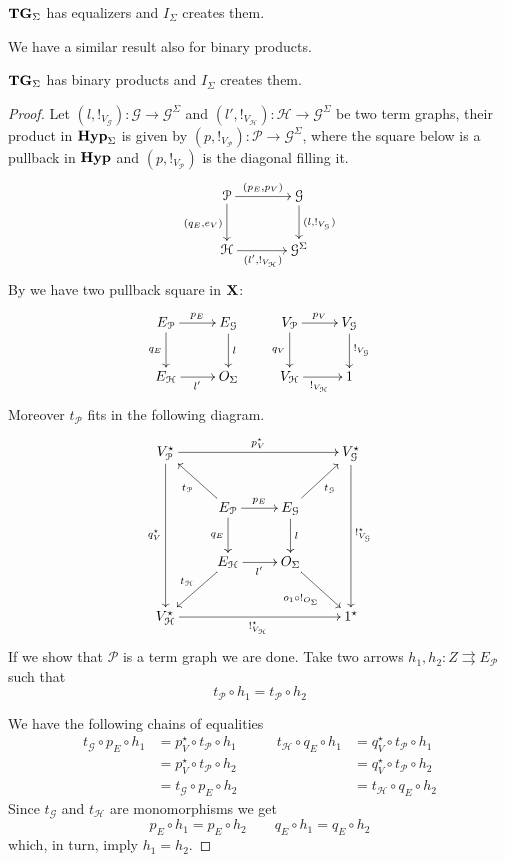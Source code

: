 \documentclass[runningheads,envcountsect]{lipics-v2021}
\def\X{\textbf {\textup{X}}}
\newcommand{\catname}[1]{\textbf{\textup{#1}}}
\newcommand{\hyp}{\catname{Hyp}}
\newcommand{\tg}[0]{\catname{TG}_{\Sigma}}
\begin{document}
\begin{proposition}\label{prop:equ}$\tg$ has equalizers and $I_{\Sigma}$ creates them.
\end{proposition}

We have a similar result also for binary products.

\begin{proposition} $\tg$ has binary products and $I_\Sigma$ creates them.
\end{proposition}
\begin{proof}
	Let $(l, !_{V_\mathcal{G}})\colon \mathcal{G}\to \mathcal{G}^{\Sigma}$ and $(l', !_{V_\mathcal{H}})\colon \mathcal{H}\to \mathcal{G}^{\Sigma}$ be two term graphs, their product in $\hyp_{\Sigma}$ is given by $(p, !_{V_\mathcal{P}})\colon \mathcal{P}\to \mathcal{G}^{\Sigma}$, where the square below  is a pullback in $\hyp$ and $(p, !_{V_\mathcal{P}})$ is the diagonal filling it.
	\[\xymatrix@C=35pt{\mathcal{P} \ar[r]^{(p_E, p_V)} \ar[d]_{(q_E, e_V)} & \mathcal{G} \ar[d]^{(l, !_{V_\mathcal{G}})}\\ \mathcal{H} \ar[r]_{(l', !_{V_{\mathcal{H}}})}& \mathcal{G}^\Sigma}\]
	By  we have two pullback square in $\X$:
	\[\xymatrix{E_\mathcal{P} \ar[r]^{p_E} \ar[d]_{q_E} & E_\mathcal{G} \ar[d]^{l} &V_{\mathcal{P}} \ar[r]^{p_V} \ar[d]_{q_V}&V_{\mathcal{G}}\ar[d]^{!_{V_\mathcal{G}}} \\ E_\mathcal{H} \ar[r]_{l'}& O_\Sigma & V_\mathcal{H}\ar[r]_{!_{V_\mathcal{H}}} & 1}\]
	Moreover $t_{\mathcal{P}}$ fits in the following diagram.
	\[\xymatrix{V^\star_{\mathcal{P}} \ar[rrr]^{p^\star_V} \ar[ddd]_{q^\star_V}& & &V_{\mathcal{G}}^\star \ar[ddd]^{!^\star_{V_\mathcal{G}}}\\&E_\mathcal{P} \ar[ul]^{t_{\mathcal{P}}}\ar[r]^{p_E} \ar[d]_{q_E} & E_\mathcal{G} \ar[ur]_{t_{\mathcal{G}}} \ar[d]^{l}  \\ &E_\mathcal{H} \ar[dl]_{t_{\mathcal{H}}} \ar[r]_{l'}& O_\Sigma \ar[dr]_{o_1\circ !_{O_\Sigma}} \\V^\star_{\mathcal{H}} \ar[rrr]_{!^\star_{V_\mathcal{H}}}& & &1^\star}\]
	If we show that $\mathcal{P}$ is a term graph we are done. Take two arrows $h_1, h_{2}\colon Z\rightrightarrows  E_{\mathcal{P}}$ such that 
	\[t_{\mathcal{P}}\circ h_1= t_{\mathcal{P}}\circ h_2 \]
	
	We have the following chains of equalities 
	\[\begin{split}
		t_{\mathcal{G}}\circ p_E \circ h_1&=p^\star_V\circ t_{\mathcal{P}} \circ h_1 \\&=p^\star_V\circ t_{\mathcal{P}}\circ h_2\\&=t_{\mathcal{G}}\circ p_E\circ h_2
	\end{split} \qquad \begin{split}
		t_{\mathcal{H}}\circ q_E\circ h_1&=q^\star_V\circ t_{\mathcal{P}} \circ h_1\\&=q^\star_V\circ t_{\mathcal{P}}\circ h_2\\&=t_{\mathcal{H}} \circ q_E\circ h_2
	\end{split}\]
	Since $t_{\mathcal{G}}$ and $t_{\mathcal{H}}$ are monomorphisms we get
	\[p_E \circ h_1=p_E\circ h_2 \qquad q_E\circ h_1=q_E \circ h_2\]
	which, in turn, imply  $h_1=h_2$.	  
\end{proof}
\end{document}
